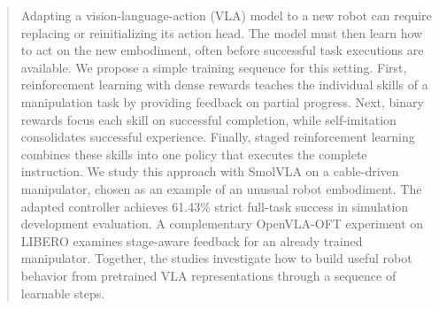 \begin{abstract}
Adapting a vision-language-action (VLA) model to a new robot can require replacing or reinitializing its action head. The model must then learn how to act on the new embodiment, often before successful task executions are available. We propose a simple training sequence for this setting. First, reinforcement learning with dense rewards teaches the individual skills of a manipulation task by providing feedback on partial progress. Next, binary rewards focus each skill on successful completion, while self-imitation consolidates successful experience. Finally, staged reinforcement learning combines these skills into one policy that executes the complete instruction. We study this approach with SmolVLA on a cable-driven manipulator, chosen as an example of an unusual robot embodiment. The adapted controller achieves 61.43\% strict full-task success in simulation development evaluation. A complementary OpenVLA-OFT experiment on LIBERO examines stage-aware feedback for an already trained manipulator.  Together, the studies investigate how to build useful robot behavior from pretrained VLA representations through a sequence of learnable steps.
\end{abstract}
